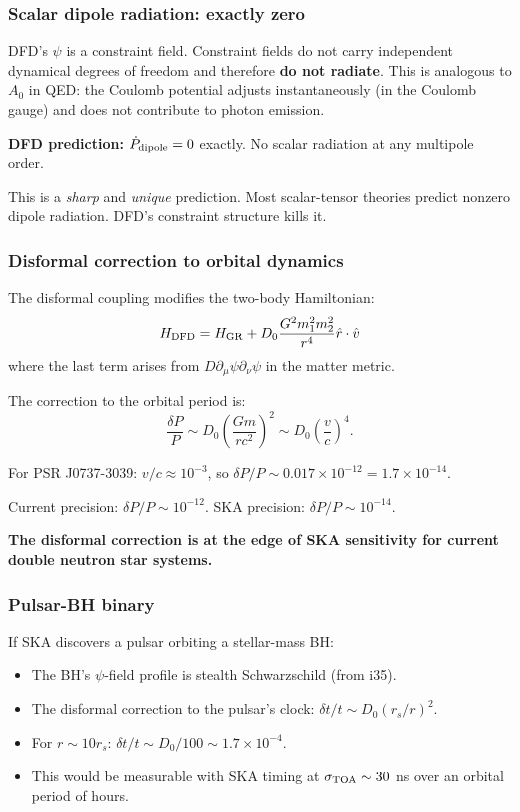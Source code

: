 \documentclass[11pt,a4paper]{article}
\begin{document}
\subsubsection{Scalar dipole radiation: exactly zero}

DFD's $\psi$ is a constraint field. Constraint fields do not carry independent dynamical degrees of freedom and therefore \textbf{do not radiate}. This is analogous to $A_0$ in QED: the Coulomb potential adjusts instantaneously (in the Coulomb gauge) and does not contribute to photon emission.

\textbf{DFD prediction:} $\dot{P}_{\rm dipole} = 0$ exactly. No scalar radiation at any multipole order.

This is a \emph{sharp} and \emph{unique} prediction. Most scalar-tensor theories predict nonzero dipole radiation. DFD's constraint structure kills it.

\subsubsection{Disformal correction to orbital dynamics}

The disformal coupling modifies the two-body Hamiltonian:
\begin{equation}
H_{\rm DFD} = H_{\rm GR} + D_0\frac{G^2m_1^2 m_2^2}{r^4}\hat{r}\cdot\hat{v}
\end{equation}
where the last term arises from $D\partial_\mu\psi\partial_\nu\psi$ in the matter metric.

The correction to the orbital period is:
\begin{equation}
\frac{\delta P}{P} \sim D_0\left(\frac{Gm}{rc^2}\right)^2 \sim D_0\left(\frac{v}{c}\right)^4.
\end{equation}

For PSR J0737-3039: $v/c \approx 10^{-3}$, so $\delta P/P \sim 0.017 \times 10^{-12} = 1.7 \times 10^{-14}$.

Current precision: $\delta P/P \sim 10^{-12}$. SKA precision: $\delta P/P \sim 10^{-14}$.

\textbf{The disformal correction is at the edge of SKA sensitivity for current double neutron star systems.}

\subsubsection{Pulsar-BH binary}

If SKA discovers a pulsar orbiting a stellar-mass BH:
\begin{itemize}
\item The BH's $\psi$-field profile is stealth Schwarzschild (from i35).
\item The disformal correction to the pulsar's clock: $\delta t/t \sim D_0(r_s/r)^2$.
\item For $r \sim 10 r_s$: $\delta t/t \sim D_0/100 \sim 1.7 \times 10^{-4}$.
\item This would be measurable with SKA timing at $\sigma_{\rm TOA} \sim 30$ ns over an orbital period of hours.
\end{itemize}
\end{document}
